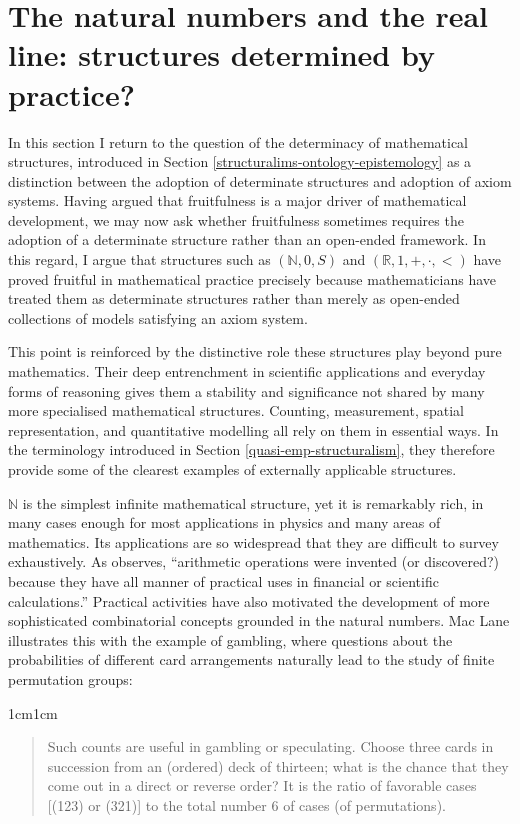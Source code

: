 \documentclass[11pt,a4paper]{article}
\begin{document}
\section{The natural numbers and the real line: structures determined by practice?}
\label{natural-reals}

In this section I return to the question of the determinacy of mathematical structures, introduced in Section \ref{structuralims-ontology-epistemology} as a distinction between the adoption of determinate structures and adoption of axiom systems. Having argued that fruitfulness is a major driver of mathematical development, we may now ask whether fruitfulness sometimes requires the adoption of a determinate structure rather than an open-ended framework. In this regard, I argue that structures such as $(\mathbb{N}, 0, S)$ and $(\mathbb{R},1, +, \cdot, <)$ have proved fruitful in mathematical practice precisely because mathematicians have treated them as determinate structures rather than merely as open-ended collections of models satisfying an axiom system. 

This point is reinforced by the distinctive role these structures play beyond pure mathematics. Their deep entrenchment in scientific applications and everyday forms of reasoning gives them a stability and significance not shared by many more specialised mathematical structures. Counting, measurement, spatial representation, and quantitative modelling all rely on them in essential ways. In the terminology introduced in Section \ref{quasi-emp-structuralism}, they therefore provide some of the clearest examples of externally applicable structures.

$\mathbb{N}$ is the simplest infinite mathematical structure, yet it is remarkably rich, in many cases enough for most applications in physics and many areas of mathematics. Its applications are so widespread that they are difficult to survey exhaustively. As \textcite[10]{maclane1986mathematics} observes, ``arithmetic operations were invented (or discovered?) because they have all manner of practical uses in financial or scientific calculations.'' Practical activities have also motivated the development of more sophisticated combinatorial concepts grounded in the natural numbers. Mac Lane illustrates this with the example of gambling, where questions about the probabilities of different card arrangements naturally lead to the study of finite permutation groups:

\begin{adjustwidth}{1cm}{1cm}
\begin{quote}
  \small
Such counts are useful in gambling or speculating. Choose three cards in succession from an (ordered) deck of thirteen; what is the chance that they come out in a direct or reverse order? It is the ratio of favorable cases [(123) or (321)] to the total number 6 of cases (of permutations). \parencite[12]{maclane1986mathematics}
\end{quote}
\end{adjustwidth}
\end{document}
